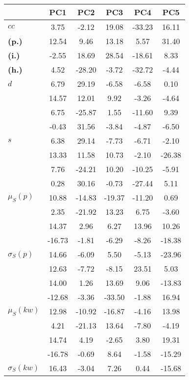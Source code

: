 \begin{table}[h!]
\begin{center}
\begin{tabular}{| l || c | c | c | c | c |}\hline
 & {\bf PC1} & {\bf PC2} & {\bf PC3} & {\bf PC4} & {\bf PC5} \\\hline\hline
{\bf $cc$} & 3.75 & -2.12 & 19.08 & -33.23 & 16.11 \\
{\bf (p.)} & 12.54 & 9.46 & 13.18 & 5.57 & 31.40 \\
{\bf (i.)} & -2.55 & 18.69 & 28.54 & -18.61 & 8.33 \\
{\bf (h.)} & 4.52 & -28.20 & -3.72 & -32.72 & -4.44 \\\hline
{\bf $d$} & 6.79 & 29.19 & -6.58 & -6.58 & 0.10 \\
{\bf } & 14.57 & 12.01 & 9.92 & -3.26 & -4.64 \\
{\bf } & 6.75 & -25.87 & 1.55 & -11.60 & 9.39 \\
{\bf } & -0.43 & 31.56 & -3.84 & -4.87 & -6.50 \\\hline
{\bf $s$} & 6.38 & 29.14 & -7.73 & -6.71 & -2.10 \\
{\bf } & 13.33 & 11.58 & 10.73 & -2.10 & -26.38 \\
 & 7.76  & -24.21  & 10.20  & -10.25  & -5.91 \\
 & 0.28  & 30.16  & -0.73  & -27.44  & 5.11 \\\hline
$\mu_S(p)$ & 10.88  & -14.83  & -19.37  & -11.20  & 0.69 \\
 & 2.35  & -21.92  & 13.23  & 6.75  & -3.60 \\
 & 14.37  & 2.96  & 6.27  & 13.96  & 10.26 \\
 & -16.73  & -1.81  & -6.29  & -8.26  & -18.38 \\\hline
$\sigma_S(p)$ & 14.66  & -6.09  & 5.50  & -5.13  & -23.96 \\
 & 12.63  & -7.72  & -8.15  & 23.51  & 5.03 \\
 & 14.00  & 1.26  & 13.69  & 9.06  & -13.83 \\
 & -12.68  & -3.36  & -33.50  & -1.88  & 16.94 \\\hline
$\mu_S(kw)$ & 12.98  & -10.92  & -16.87  & -4.16  & 13.98 \\
 & 4.21  & -21.13  & 13.64  & -7.80  & -4.19 \\
 & 14.74  & 4.19  & -2.65  & 3.80  & 19.31 \\
 & -16.78  & -0.69  & 8.64  & -1.58  & -15.29 \\\hline
$\sigma_S(kw)$ & 16.43  & -3.04  & 7.26  & 0.44  & -15.68 \\

\end{tabular}
\end{center}
\end{table}

